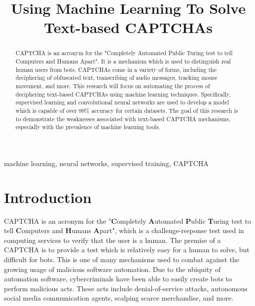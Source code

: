 \documentclass[11pt,conference]{IEEEtran}
\begin{document}
\title{Using Machine Learning To Solve Text-based CAPTCHAs\\
}

\author{
}

\maketitle

\begin{abstract}
    CAPTCHA is an acronym for the "Completely Automated Public Turing test
    to tell Computers and Humans Apart". It is a mechanism which is used to
    distinguish real human users from bots. CAPTCHAs come in a variety of forms,
    including the deciphering of obfuscated text, transcribing of audio messages,
    tracking mouse movement, and more. This research will focus on automating the
    process of deciphering text-based CAPTCHAs using machine learning
    techniques. Specifically, supervised learning and convolutional neural
    networks are used to develop
    a model which is capable of over 99\% accuracy for certain datasets. 
    The goal of this research is to demonstrate the weaknesses associated with text-based
    CAPTCHA mechanisms, especially with the prevalence of machine learning
    tools.
\end{abstract}

\begin{IEEEkeywords}
    machine learning, neural networks, supervised training, CAPTCHA
\end{IEEEkeywords}

\section{Introduction}
CAPTCHA is an acronym for the "\textbf{C}ompletely \textbf{A}utomated
\textbf{P}ublic \textbf{T}uring test to tell
\textbf{C}omputers and \textbf{H}umans \textbf{A}part", which is a
challenge-response test used in computing services to verify that the user is a
human. The premise of a CAPTCHA is to provide a test which is relatively easy
for a human to solve, but difficult for bots. This is one of many 
mechanisms used to combat against the growing usage of malicious software
automation. Due to the ubiquity of automation software, cybercriminals have
been able to easily create bots to perform malicious acts. These acts include
denial-of-service attacks, autonomous social media communication agents,
scalping scarce merchandise, and more.
\end{document}
